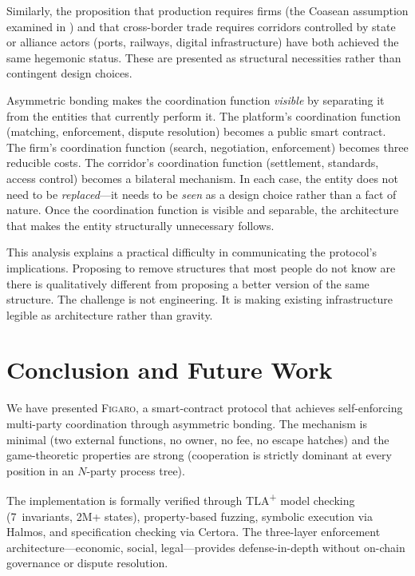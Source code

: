 \documentclass[11pt,a4paper]{article}
\theoremstyle{definition}
\theoremstyle{remark}
\newcommand{\figaro}{\textsc{Figaro}}
\begin{document}
Similarly, the proposition that production requires firms (the Coasean
assumption examined in ) and that cross-border
trade requires corridors controlled by state or alliance actors
(ports, railways, digital infrastructure) have both achieved the same
hegemonic status. These are presented as structural necessities rather
than contingent design choices.

Asymmetric bonding makes the coordination function \emph{visible} by
separating it from the entities that currently perform it. The platform's
coordination function (matching, enforcement, dispute resolution)
becomes a public smart contract. The firm's coordination function
(search, negotiation, enforcement) becomes three reducible costs. The
corridor's coordination function (settlement, standards, access
control) becomes a bilateral mechanism. In each case, the entity does
not need to be \emph{replaced}---it needs to be \emph{seen} as a design
choice rather than a fact of nature. Once the coordination function is
visible and separable, the architecture that makes the entity
structurally unnecessary follows.

This analysis explains a practical difficulty in communicating the
protocol's implications. Proposing to remove structures that most
people do not know are there is qualitatively different from proposing
a better version of the same structure. The challenge is not
engineering. It is making existing infrastructure legible as
architecture rather than gravity.

\section{Conclusion and Future Work}
\label{sec:conclusion}

We have presented \figaro{}, a smart-contract protocol that achieves
self-enforcing multi-party coordination through asymmetric bonding. The
mechanism is minimal (two external functions, no owner, no fee, no
escape hatches) and the game-theoretic properties are strong (cooperation
is strictly dominant at every position in an $N$-party process tree).

The implementation is formally verified through TLA\textsuperscript{+}
model checking (7~invariants, 2M+ states), property-based fuzzing,
symbolic execution via Halmos, and specification checking via Certora.
The three-layer enforcement architecture---economic, social,
legal---provides defense-in-depth without on-chain governance or
dispute resolution.
\end{document}

